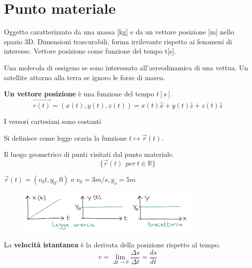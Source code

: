 \section{Punto materiale}
Oggetto caratterizzato da una massa [kg] e da un vettore posizione [m] nello spazio 3D.
Dimensioni trascurabili, forma irrilevante rispetto ai fenomeni di interesse.
Vettore posizione come funzione del tempo t[s].
\begin{example}
    Una molecola di ossigeno se sono interessato all'aereodinamica di una vettua. 
    Un satellite attorno alla terra se ignoro le forze di marea.
\end{example}
\hspace{-15pt}\textbf{Un vettore posizione} è una funzione del tempo $t[s]$.
$$\vec{r(t)} = (x(t), y(t), z(t)) = x(t)\hat{x} + y(t)\hat{z} + z(t)\hat{z}$$
\begin{observation}
    I versori cartesiani sono costanti
\end{observation}

\begin{definition}
    Si definisce come legge oraria la funzione $t \mapsto \vec{r}(t)$.
\end{definition}

\begin{definition}[Traiettoria]
    Il luogo geometrico di punti visitati dal punto materiale.
    $$\{\vec{r}(t)\:\: per \: t \in \mathbb{R}\}$$
\end{definition}

\begin{example}
    $\vec{r}(t) = (v_0t, y_0, 0)$ e $v_0 = 3m/s, y_o = 5m$ 
    \begin{figure}[h!]
        \centering
        \includegraphics[width=0.8\textwidth]{images/ess-traiettoria.png}
    \end{figure}
\end{example}

\begin{definition}
    La \textbf{velocità istantanea} è la derivata della posizione rispetto al tempo.
    $$v = \lim_{\Delta t \to 0}\frac{\Delta s}{\Delta t} = \frac{ds}{dt}$$
\end{definition}

